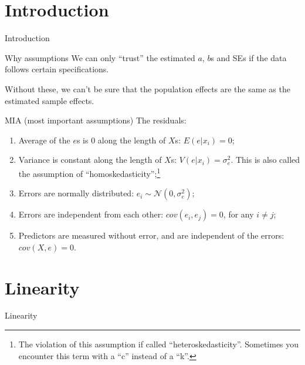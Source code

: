 \documentclass[12pt,english,pdf,xcolor=dvipsnames,aspectratio=169,handout]{beamer}\usepackage[]{graphicx}\usepackage[]{xcolor}
\begin{document}
\section{Introduction}

\begin{frame}
\begin{center}
    \Huge Introduction
\end{center}
\end{frame}


\begin{frame}{Why assumptions}
  We can only ``trust'' the estimated $a$, $b$s and SEs if the data follows certain specifications.\bigskip

  Without these, we can't be sure that the population effects are the same as the estimated sample effects.
  
\end{frame}



\begin{frame}{MIA (most important assumptions)}
  The residuals:

  \begin{enumerate}
  \item Average of the $e$s is 0 along the length of $X$s: $E(e | x_i)=0$;
  \item Variance is constant along the length of $X$s: $V(e | x_i) = \sigma_e^2$. This is also called the assumption of ``homoskedasticity'';\footnote{The violation of this assumption if called ``heteroskedasticity''. Sometimes you encounter this term with a ``c'' instead of a ``k''.}
  \item Errors are normally distributed: $e_i \sim \mathcal{N}(0, \sigma_e^2)$;
  \item Errors are independent from each other: $cov(e_i,e_j)=0$, for any $i \neq j$;
  \item Predictors are measured without error, and are independent of the errors: $cov(X,e)=0$.
  \end{enumerate}
  
\end{frame}


\section{Linearity}


\begin{frame}
\begin{center}
    \Huge Linearity
\end{center}
\end{frame}
\end{document}
